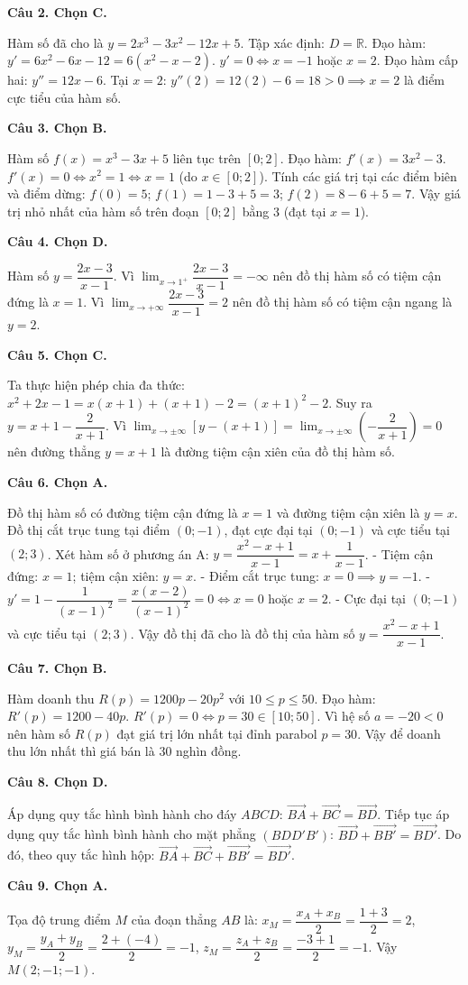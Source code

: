 \documentclass[12pt,a4paper]{article}
\newcommand{\loigiai}[1]{\par\medskip\Needspace{4\baselineskip}\noindent\textbf{#1}\par\nobreak}
\begin{document}
\loigiai{Câu 2. Chọn C.}
Hàm số đã cho là $y=2x^3-3x^2-12x+5$.
Tập xác định: $D=\mathbb{R}$.
Đạo hàm: $y'=6x^2-6x-12=6(x^2-x-2)$.
$y'=0 \iff x=-1$ hoặc $x=2$.
Đạo hàm cấp hai: $y''=12x-6$.
Tại $x=2$: $y''(2)=12(2)-6=18>0 \implies x=2$ là điểm cực tiểu của hàm số.

\loigiai{Câu 3. Chọn B.}
Hàm số $f(x)=x^3-3x+5$ liên tục trên $[0;2]$.
Đạo hàm: $f'(x)=3x^2-3$.
$f'(x)=0 \iff x^2=1 \iff x=1$ (do $x\in[0;2]$).
Tính các giá trị tại các điểm biên và điểm dừng:
$f(0)=5$; $f(1)=1-3+5=3$; $f(2)=8-6+5=7$.
Vậy giá trị nhỏ nhất của hàm số trên đoạn $[0;2]$ bằng $3$ (đạt tại $x=1$).

\loigiai{Câu 4. Chọn D.}
Hàm số $y=\dfrac{2x-3}{x-1}$.
Vì $\lim_{x\to 1^+} \dfrac{2x-3}{x-1} = -\infty$ nên đồ thị hàm số có tiệm cận đứng là $x=1$.
Vì $\lim_{x\to +\infty} \dfrac{2x-3}{x-1} = 2$ nên đồ thị hàm số có tiệm cận ngang là $y=2$.

\loigiai{Câu 5. Chọn C.}
Ta thực hiện phép chia đa thức:
$x^2+2x-1 = x(x+1) + (x+1) - 2 = (x+1)^2 - 2$.
Suy ra $y = x+1 - \dfrac{2}{x+1}$.
Vì $\lim_{x\to \pm\infty} [y - (x+1)] = \lim_{x\to \pm\infty} \left(-\dfrac{2}{x+1}\right) = 0$ nên đường thẳng $y=x+1$ là đường tiệm cận xiên của đồ thị hàm số.

\loigiai{Câu 6. Chọn A.}
Đồ thị hàm số có đường tiệm cận đứng là $x=1$ và đường tiệm cận xiên là $y=x$.
Đồ thị cắt trục tung tại điểm $(0;-1)$, đạt cực đại tại $(0;-1)$ và cực tiểu tại $(2;3)$.
Xét hàm số ở phương án A: $y=\dfrac{x^2-x+1}{x-1} = x + \dfrac{1}{x-1}$.
- Tiệm cận đứng: $x=1$; tiệm cận xiên: $y=x$.
- Điểm cắt trục tung: $x=0 \implies y=-1$.
- $y'=1-\dfrac{1}{(x-1)^2} = \dfrac{x(x-2)}{(x-1)^2} = 0 \iff x=0$ hoặc $x=2$.
- Cực đại tại $(0;-1)$ và cực tiểu tại $(2;3)$.
Vậy đồ thị đã cho là đồ thị của hàm số $y=\dfrac{x^2-x+1}{x-1}$.

\loigiai{Câu 7. Chọn B.}
Hàm doanh thu $R(p)=1200p-20p^2$ với $10\le p\le 50$.
Đạo hàm: $R'(p)=1200-40p$.
$R'(p)=0 \iff p=30\in[10;50]$.
Vì hệ số $a=-20<0$ nên hàm số $R(p)$ đạt giá trị lớn nhất tại đỉnh parabol $p=30$.
Vậy để doanh thu lớn nhất thì giá bán là $30$ nghìn đồng.

\loigiai{Câu 8. Chọn D.}
Áp dụng quy tắc hình bình hành cho đáy $ABCD$: $\vec{BA}+\vec{BC}=\vec{BD}$.
Tiếp tục áp dụng quy tắc hình bình hành cho mặt phẳng $(BDD'B')$:
$\vec{BD}+\vec{BB'}=\vec{BD'}$.
Do đó, theo quy tắc hình hộp: $\vec{BA}+\vec{BC}+\vec{BB'}=\vec{BD'}$.

\loigiai{Câu 9. Chọn A.}
Tọa độ trung điểm $M$ của đoạn thẳng $AB$ là:
$x_M=\dfrac{x_A+x_B}{2}=\dfrac{1+3}{2}=2$,
$y_M=\dfrac{y_A+y_B}{2}=\dfrac{2+(-4)}{2}=-1$,
$z_M=\dfrac{z_A+z_B}{2}=\dfrac{-3+1}{2}=-1$.
Vậy $M(2;-1;-1)$.
\end{document}
